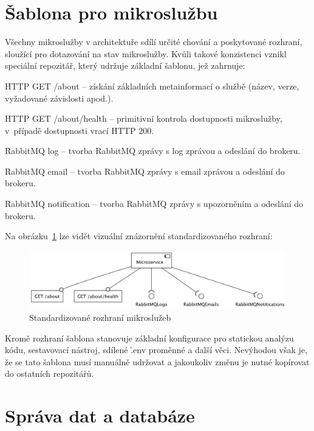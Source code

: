 \section{Šablona pro mikroslužbu}\label{sec:server-template}

Všechny mikroslužby v architektuře sdílí určité chování a poskytované rozhraní, sloužící pro dotazování na stav mikroslužby.
Kvůli takové konzistenci vznikl speciální repozitář, který udržuje základní šablonu, jež zahrnuje:

\begin{ul}
   \item \h{HTTP GET /about} – získání základních metainformací o službě (název, verze, vyžadované závislosti apod.).
   \item \h{HTTP GET /about/health} – primitivní kontrola dostupnosti mikroslužby, v~případě dostupnosti vrací \h{HTTP 200}.
   \item \h{RabbitMQ log} – tvorba RabbitMQ zprávy s log zprávou a odeslání do brokeru.
   \item \h{RabbitMQ email} – tvorba RabbitMQ zprávy s email zprávou a odeslání do brokeru.
   \item \h{RabbitMQ notification} – tvorba RabbitMQ zprávy s upozorněním a odeslání do brokeru.
\end{ul}

Na obrázku~\ref{fig:ms-template} lze vidět vizuální znázornění standardizovaného rozhraní:

\begin{figure}[htbp]
   \centering
   \includegraphics[max width=\textwidth]{assets/ms}
   \caption{Standardizované rozhraní mikroslužeb}\label{fig:ms-template}
\end{figure}

Kromě rozhraní šablona stanovuje základní konfigurace pro statickou analýzu kódu, sestavovací nástroj, sdílené \h{.env} proměnné a další věci.
Nevýhodou však je, že se tato šablona musí manuálně udržovat a jakoukoliv změnu je nutné kopírovat do ostatních repozitářů.



\section{Správa dat a databáze}\label{sec:server-db}

